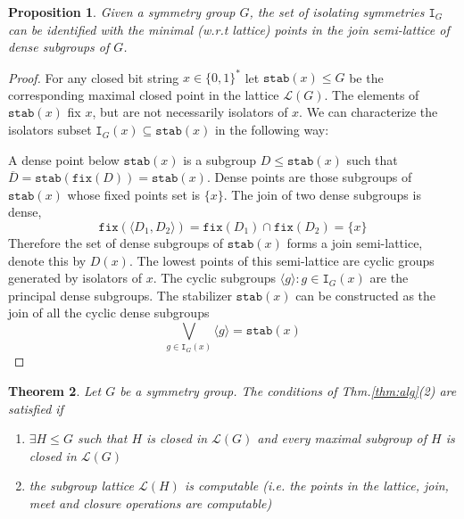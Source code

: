 \documentclass{article}
\newtheorem{theorem}{Theorem}[section]
\newtheorem{proposition}[theorem]{Proposition}
\newcommand{\bin}{\{0,1\}^*} %
\newcommand{\st}{\mathtt{stab}}
\newcommand{\I}{\mathtt{I}}
\newcommand{\fix}{\mathtt{fix}}
\begin{document}
\begin{proposition}
    Given a symmetry group $G$, the set of isolating symmetries $\I_G$ can be identified with the minimal (w.r.t lattice) points in the join semi-lattice of dense subgroups of $G$. 
\end{proposition}
\begin{proof}
    For any closed bit string $x \in \bin$ let $\st(x) \leq G$ be the corresponding maximal closed point in the lattice $\mathcal{L}(G)$. The elements of $\st(x)$ fix $x$, but are not necessarily isolators of $x$. We can characterize the isolators subset $\I_G(x) \subseteq \st(x)$ in the following way:

    A dense point below $\st(x)$ is a subgroup $D \leq \st(x)$ such that $\overline{D} = \st(\fix(D)) = \st(x)$. Dense points are those subgroups of $\st(x)$ whose fixed points set is $\{x\}$. The join of two dense subgroups is dense, 
    \begin{equation}
        \fix(\langle D_1, D_2 \rangle) = \fix(D_1) \cap \fix(D_2) = \{x \}
    \end{equation}
    Therefore the set of dense subgroups of $\st(x)$ forms a join semi-lattice, denote this by $D(x)$. The lowest points of this semi-lattice are cyclic groups generated by isolators of $x$. The cyclic subgroups $\langle g \rangle : g \in \I_G(x)$ are the principal dense subgroups. The stabilizer $\st(x)$ can be constructed as the join of all the cyclic dense subgroups 
    \begin{equation}
        \bigvee_{g \in \I_G(x)} \langle g \rangle = \st(x)
    \end{equation}
\end{proof}

\begin{theorem}
    Let $G$ be a symmetry group. The conditions of Thm.\ref{thm:alg}(2) are satisfied if
    \begin{enumerate}
        \item $\exists H \leq G$ such that $H$ is closed in $\mathcal{L}(G)$ and every maximal subgroup of $H$ is closed in $\mathcal{L}(G)$
        \item the subgroup lattice $\mathcal{L}(H)$ is computable (i.e. the points in the lattice, join, meet and closure operations are computable)
    \end{enumerate}
\end{theorem}
\end{document}
